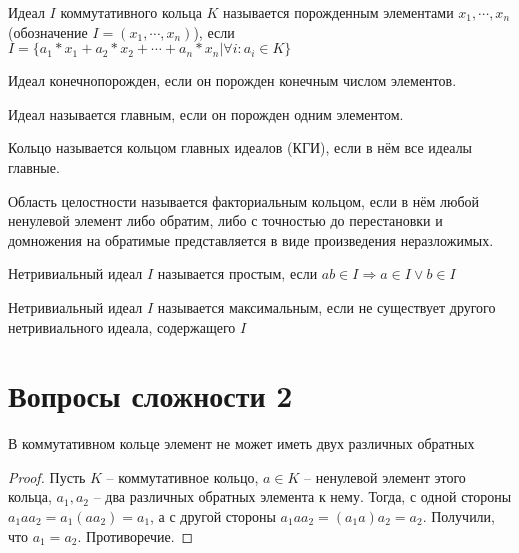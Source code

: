 \documentclass{article}
\begin{document}
\begin{definition}
    Идеал $I$ коммутативного кольца $K$ называется порожденным элементами $x_1, \cdots, x_n$ (обозначение $I = (x_1,
    \cdots, x_n)$), если $I = \{a_1 * x_1 + a_2 * x_2 + \cdots + a_n * x_n | \forall i: a_i \in K\}$
\end{definition}

\begin{definition}
    Идеал конечнопорожден, если он порожден конечным числом элементов.
\end{definition}

\begin{definition}
    Идеал называется главным, если он порожден одним элементом.
\end{definition}

\begin{definition}
    Кольцо называется кольцом главных идеалов (КГИ), если в нём все идеалы главные.
\end{definition}

\begin{definition}
    Область целостности называется факториальным кольцом, если в нём любой ненулевой элемент либо обратим, либо с
    точностью до перестановки и домножения на обратимые представляется в виде произведения неразложимых.
\end{definition}

\begin{definition}
    Нетривиальный идеал $I$ называется простым, если $ab \in I \Rightarrow a \in I \vee b \in I$
\end{definition}

\begin{definition}
    Нетривиальный идеал $I$ называется максимальным, если не существует другого нетривиального идеала, содержащего $I$
\end{definition}

\section{Вопросы сложности 2}

\begin{statement}
    В коммутативном кольце элемент не может иметь двух различных обратных
\end{statement}

\begin{proof}
    Пусть $K$ -- коммутативное кольцо, $a \in K$ -- ненулевой элемент этого кольца, $a_1, a_2$ -- два различных обратных
    элемента к нему.
    Тогда, с одной стороны $a_1 a a_2 = a_1 (a a_2) = a_1$, а с другой стороны $a_1 a a_2 = (a_1 a) a_2 = a_2$.
    Получили, что $a_1 = a_2$. Противоречие.
\end{proof}
\end{document}
